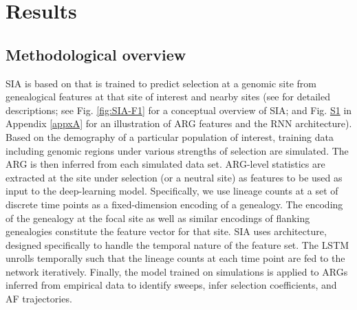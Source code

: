 \section{Results}
\subsection{Methodological overview}
\ac{SIA} is based on  that is trained to predict selection at a genomic site from genealogical features at that site of interest and nearby sites (see  for detailed descriptions; see Fig. \ref{fig:SIA-F1} for a conceptual overview of \ac{SIA}; and Fig. \href{https://academic.oup.com/mbe/article/39/1/msab332/6433161#supplementary-data}{S1} in Appendix \ref{appxA} for an illustration of \ac{ARG} features and the \ac{RNN} architecture). Based on the demography of a particular population of interest, training data including genomic regions under various strengths of selection are simulated. The \ac{ARG} is then inferred from each simulated data set. \ac{ARG}-level statistics are extracted at the site under selection (or a neutral site) as features to be used as input to the deep-learning model. Specifically, we use lineage counts at a set of discrete time points as a fixed-dimension encoding of a genealogy. The encoding of the genealogy at the focal site as well as similar encodings of flanking genealogies constitute the feature vector for that site. \ac{SIA} uses  architecture, designed specifically to handle the temporal nature of the feature set. The \ac{LSTM} unrolls temporally such that the lineage counts at each time point are fed to the network iteratively. Finally, the model trained on simulations is applied to \acp{ARG} inferred from empirical data to identify sweeps, infer selection coefficients, and \ac{AF} trajectories.

